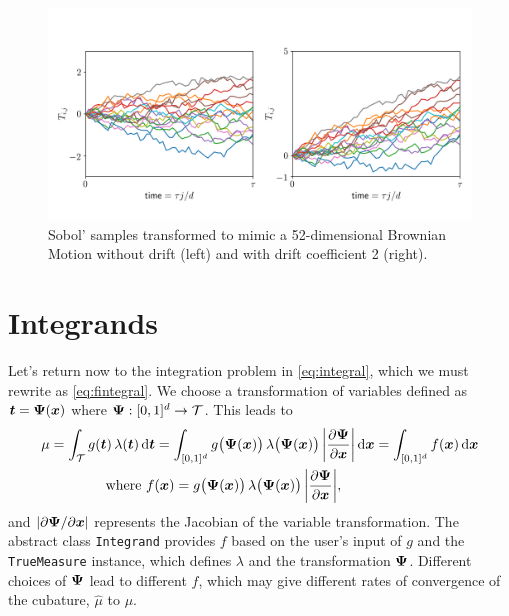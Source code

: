 \documentclass[graybox,footinfo]{svmult}
\newcommand{\QMCPYabs}[1]{\ensuremath{{\left \lvert #1 \right \rvert}}}
\newcommand{\hmu}{\widehat{\mu}}
\newcommand{\cube}{[0,1]^d}
\begin{document}
\begin{figure}
	\includegraphics[width=1\textwidth]{QMCSoftwareArticle/figs/tm_bm.png} 
	\caption{Sobol' samples transformed to mimic a 52-dimensional Brownian Motion without drift (left) and with drift coefficient 2 (right).}
	\label{fig:tm_bm}
\end{figure}

\section{Integrands}

Let's return now to the integration problem in \eqref{eq:integral}, which we must rewrite as \eqref{eq:fintegral}.  We choose a transformation of variables defined as ${\boldsymbol{t}} = {\boldsymbol{\Psi}}({\boldsymbol{x}})$ where $\bsPsi:\cube \to \calT$.  This leads to 
\begin{align}
	\nonumber 
 \mu &= \int_\calT g(\bst) \, \lambda(\bst) \, \D \bst  = \int_{\cube} g\bigl(\bsPsi(\bsx)\bigr) \, \lambda\bigl(\bsPsi(\bsx)\bigr) \,\QMCPYabs{\frac{\partial \bsPsi}{\partial \bsx}} \, \D \bsx =  \int_{\cube}f(\bsx) \, \D \bsx  \\
 \label{eq:transVar}
  & \qquad \qquad \text{where } f(\bsx)  = g\bigl(\bsPsi(\bsx)\bigr)  \, \lambda\bigl(\bsPsi(\bsx)\bigr) \,\QMCPYabs{\frac{\partial \bsPsi}{\partial \bsx}},
\end{align}
and $\QMCPYabs{\partial \bsPsi/\partial \bsx}$ represents the Jacobian of the variable transformation.  The abstract class \texttt{Integrand} provides $f$ based on the user's input of $g$ and the \texttt{TrueMeasure} instance, which defines $\lambda$ and the transformation ${\boldsymbol{\Psi}}$. Different choices of ${\boldsymbol{\Psi}}$ lead to different $f$, which may give different rates of convergence of the cubature, $\hmu$ to $\mu$.
\end{document}
